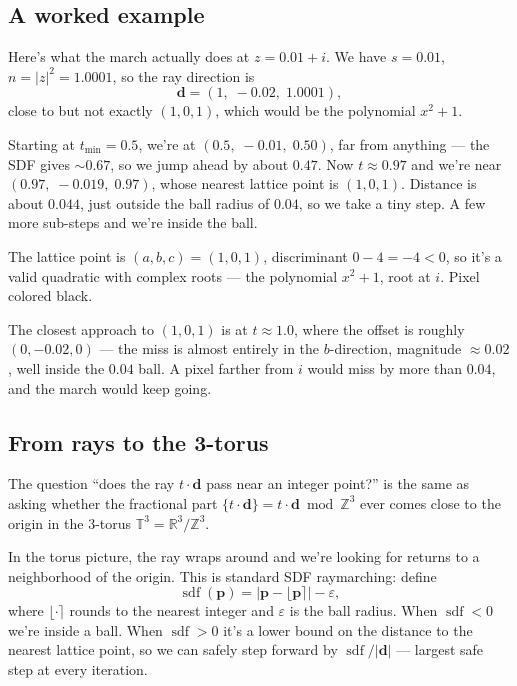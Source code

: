 \documentclass[11pt]{article}
\newcommand{\R}{\mathbb{R}}
\newcommand{\Z}{\mathbb{Z}}
\newcommand{\T}{\mathbb{T}}
\begin{document}
\subsection{A worked example}

Here's what the march actually does at $z = 0.01 + i$.
We have $s = 0.01$, $n = |z|^2 = 1.0001$, so the ray direction is
\[
    \mathbf{d} = (1,\; -0.02,\; 1.0001),
\]
close to but not exactly $(1, 0, 1)$, which would be the polynomial $x^2 + 1$.

Starting at $t_{\min} = 0.5$, we're at $(0.5,\; -0.01,\; 0.50)$, far from anything --- the SDF gives $\sim 0.67$, so we jump ahead by about $0.47$.
Now $t \approx 0.97$ and we're near $(0.97,\; -0.019,\; 0.97)$, whose nearest lattice point is $(1, 0, 1)$.
Distance is about $0.044$, just outside the ball radius of $0.04$, so we take a tiny step.
A few more sub-steps and we're inside the ball.

The lattice point is $(a, b, c) = (1, 0, 1)$, discriminant $0 - 4 = -4 < 0$, so it's a valid quadratic with complex roots --- the polynomial $x^2 + 1$, root at $i$.
Pixel colored black.

The closest approach to $(1, 0, 1)$ is at $t \approx 1.0$, where the offset is roughly $(0, -0.02, 0)$ --- the miss is almost entirely in the $b$-direction, magnitude $\approx 0.02$, well inside the $0.04$ ball.
A pixel farther from $i$ would miss by more than $0.04$, and the march would keep going.

\subsection{From rays to the 3-torus}

The question ``does the ray $t \cdot \mathbf{d}$ pass near an integer point?'' is the same as asking whether the fractional part $\{t \cdot \mathbf{d}\} = t \cdot \mathbf{d} \bmod \Z^3$ ever comes close to the origin in the 3-torus $\T^3 = \R^3 / \Z^3$.

In the torus picture, the ray wraps around and we're looking for returns to a neighborhood of the origin.
This is standard SDF raymarching: define
\[
    \operatorname{sdf}(\mathbf{p}) = |\mathbf{p} - \lfloor \mathbf{p} \rceil| - \varepsilon,
\]
where $\lfloor \cdot \rceil$ rounds to the nearest integer and $\varepsilon$ is the ball radius.
When $\operatorname{sdf} < 0$ we're inside a ball.
When $\operatorname{sdf} > 0$ it's a lower bound on the distance to the nearest lattice point, so we can safely step forward by $\operatorname{sdf} / |\mathbf{d}|$ --- largest safe step at every iteration.
\end{document}
